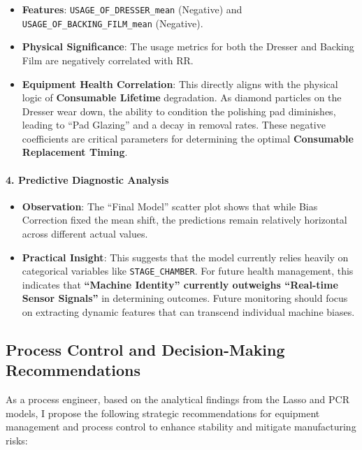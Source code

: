 \documentclass[11pt]{article}
\providecommand{\tightlist}{%
      \setlength{\itemsep}{0pt}\setlength{\parskip}{0pt}}
\begin{document}
\begin{itemize}
\tightlist
\item
  \textbf{Features}: \texttt{USAGE\_OF\_DRESSER\_mean} (Negative) and
  \texttt{USAGE\_OF\_BACKING\_FILM\_mean} (Negative).
\item
  \textbf{Physical Significance}: The usage metrics for both the Dresser
  and Backing Film are negatively correlated with RR.
\item
  \textbf{Equipment Health Correlation}: This directly aligns with the
  physical logic of \textbf{Consumable Lifetime} degradation. As diamond
  particles on the Dresser wear down, the ability to condition the
  polishing pad diminishes, leading to ``Pad Glazing'' and a decay in
  removal rates. These negative coefficients are critical parameters for
  determining the optimal \textbf{Consumable Replacement Timing}.
\end{itemize}

\paragraph{4. Predictive Diagnostic
Analysis}\label{predictive-diagnostic-analysis}

\begin{itemize}
\tightlist
\item
  \textbf{Observation}: The ``Final Model'' scatter plot shows that
  while Bias Correction fixed the mean shift, the predictions remain
  relatively horizontal across different actual values.
\item
  \textbf{Practical Insight}: This suggests that the model currently
  relies heavily on categorical variables like \texttt{STAGE\_CHAMBER}.
  For future health management, this indicates that \textbf{``Machine
  Identity'' currently outweighs ``Real-time Sensor Signals''} in
  determining outcomes. Future monitoring should focus on extracting
  dynamic features that can transcend individual machine biases.
\end{itemize}

    \subsection{Process Control and Decision-Making
Recommendations}\label{process-control-and-decision-making-recommendations}

As a process engineer, based on the analytical findings from the Lasso
and PCR models, I propose the following strategic recommendations for
equipment management and process control to enhance stability and
mitigate manufacturing risks:
\end{document}
